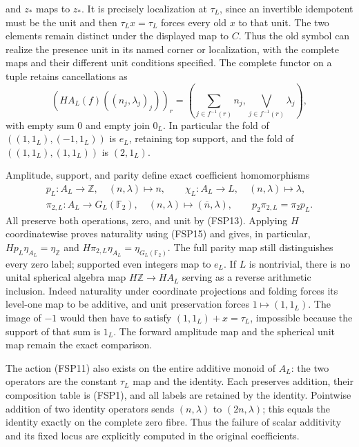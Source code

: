 and $z_*$ maps to $z_*$. It is precisely localization
at $\tau_L$, since an invertible idempotent must be
the unit and then $\tau_Lx=\tau_L$ forces every old
$x$ to that unit. The two elements remain distinct
under the displayed map to $C$.
Thus the old symbol can realize the presence unit in
its named corner or localization, with the complete
maps and their different unit conditions specified.
The complete functor on a tuple retains cancellations as
\begin{equation}\tag{FSP15}
\left(H A_L(f)((n_j,\lambda_j)_j)\right)_r
 =\left(\sum_{j\in f^{-1}(r)}n_j,
              \bigvee_{j\in f^{-1}(r)}\lambda_j\right),
\end{equation}
with empty sum $0$ and empty join $0_L$. In particular
the fold of $((1,1_L),(-1,1_L))$ is $e_L$, retaining
top support, and the fold of $((1,1_L),(1,1_L))$ is
$(2,1_L)$.

Amplitude, support, and parity define exact coefficient
homomorphisms
\begin{equation}\tag{FSP16}
\begin{gathered}
p_L:A_L\to\mathbb Z,\quad(n,\lambda)\mapsto n,\qquad
\chi_L:A_L\to L,\quad(n,\lambda)\mapsto\lambda,\\
\pi_{2,L}:A_L\to G_L(\mathbb F_2),\quad
(n,\lambda)\mapsto(\overline n,\lambda),
\qquad p_2\pi_{2,L}=\pi_2p_L.
\end{gathered}
\end{equation}
All preserve both operations, zero, and unit by (FSP13).
Applying $H$ coordinatewise proves naturality using
(FSP15) and gives, in particular,
$Hp_L\eta_{A_L}=\eta_{\mathbb Z}$ and
$H\pi_{2,L}\eta_{A_L}=\eta_{G_L(\mathbb F_2)}$.
The full parity map still distinguishes every zero label;
supported even integers map to $e_L$.
If $L$ is nontrivial, there is no unital spherical algebra
map $H\mathbb Z\to HA_L$ serving as a reverse arithmetic
inclusion. Indeed naturality under coordinate projections
and folding forces its level-one map to be additive, and
unit preservation forces $1\mapsto(1,1_L)$. The image
of $-1$ would then have to satisfy
$(1,1_L)+x=\tau_L$, impossible because the support of
that sum is $1_L$. The forward amplitude map and the
spherical unit map remain the exact comparison.

The action (FSP11) also exists on the entire additive
monoid of $A_L$: the two operators are the constant
$\tau_L$ map and the identity. Each preserves addition,
their composition table is (FSP1), and all labels are
retained by the identity. Pointwise addition of two identity
operators sends $(n,\lambda)$ to $(2n,\lambda)$; this
equals the identity exactly on the complete zero fibre.
Thus the failure of scalar additivity and its fixed locus
are explicitly computed in the original coefficients.

